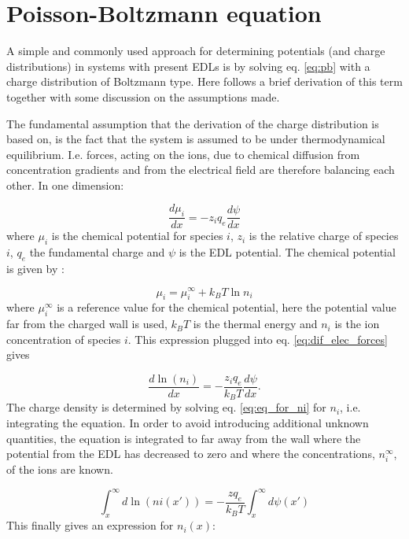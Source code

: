 \section{Poisson-Boltzmann equation}
A simple and commonly used approach for determining potentials (and
charge distributions) in systems with present EDLs is by solving
eq. \eqref{eq:pb} with a charge distribution of Boltzmann
type. Here follows a brief derivation of this term together with some
discussion on the assumptions made.

The fundamental assumption that the derivation of the charge
distribution is based on, is the fact that the system is assumed to be
under thermodynamical equilibrium. I.e. forces, acting on the ions,
due to chemical diffusion from concentration gradients and from the
electrical field are therefore balancing each other. In one dimension:

\begin{equation}\label{eq:dif_elec_forces}
\frac{d \mu_i}{dx} = -z_i q_e\frac{d\psi}{dx}
\end{equation}
where $\mu_i$ is the chemical potential for species $i$, $z_i$ is the
relative charge of species $i$, $q_e$ the fundamental charge and
$\psi$ is the EDL potential. The chemical potential is given by
\cite{ren}:

\begin{equation}
\mu_i = \mu_i^{\infty} + k_BT\ln n_i
\end{equation}
where $\mu_i^{\infty}$ is a reference value for the chemical potential,
here the potential value far from the charged wall is used, $k_BT$ is
the thermal energy and $n_i$ is the ion concentration of species
$i$. This expression plugged into eq. \eqref{eq:dif_elec_forces} gives

\begin{equation}\label{eq:eq_for_ni}
\frac{d \ln(n_i)}{dx} = - \frac{z_i q_e}{k_BT}\frac{d \psi}{dx}.
\end{equation}
The charge density is determined by solving eq. \eqref{eq:eq_for_ni}
for $n_i$, i.e. integrating the equation. In order to avoid
introducing additional unknown quantities, the equation is integrated
to far away from the wall where the potential from the EDL has
decreased to zero and where the concentrations, $n_i^{\infty}$,
of the ions are known.

\begin{equation}
\int_x^{\infty} d\ln( ni(x')) = -\frac{z q_e}{k_BT}\int_x^{\infty}d\psi(x')
\end{equation}
This finally gives an expression for $n_i(x)$:


